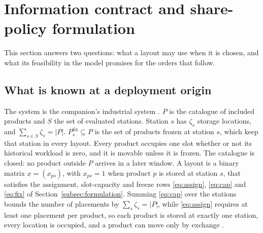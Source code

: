 \section{Information contract and share-policy formulation}\label{sec:model}
This section answers two questions: what a layout may use when it is chosen, and what its feasibility in the model promises for the orders that follow.

\subsection{What is known at a deployment origin}\label{subsec:contract}
The system is the companion's industrial system \citep{belul_companion}. $P$ is the catalogue of included products and $S$ the set of evaluated stations. Station $s$ has $\zeta_s$ storage locations, and $\sum_{s\in S}\zeta_s=|P|$. $P^{\mathrm{fix}}_s\subseteq P$ is the set of products frozen at station $s$, which keep that station in every layout. Every product occupies one slot whether or not its historical workload is zero, and it is movable unless it is frozen. The catalogue is closed: no product outside $P$ arrives in a later window. A layout is a binary matrix $x=(x_{ps})$, with $x_{ps}=1$ when product $p$ is stored at station $s$, that satisfies the assignment, slot-capacity and freeze rows \eqref{eq:assign}, \eqref{eq:cap} and \eqref{eq:fix} of Section~\ref{subsec:formulation}. Summing \eqref{eq:cap} over the stations bounds the number of placements by $\sum_{s}\zeta_s=|P|$, while \eqref{eq:assign} requires at least one placement per product, so each product is stored at exactly one station, every location is occupied, and a product can move only by exchange \citep{belul_companion}.

